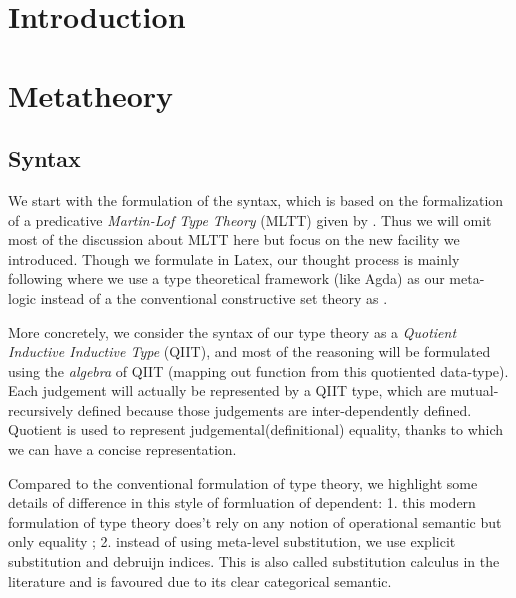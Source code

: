 \begin{abstract}

\end{abstract}

\maketitle

\section{Introduction}
\label{sec:intro}

\section{Metatheory}
\label{sec:metatheory}
\subsection{Syntax}
We start with the formulation of the syntax, which is based on the formalization of a predicative \textit{Martin-Lof Type Theory} (MLTT) given by \cite{coquand2018canonicity}. Thus we will omit most of the discussion about MLTT here but focus on the new facility we introduced. Though we formulate in Latex, our thought process is mainly following \cite{kaposi2017type} where we use a type theoretical framework (like Agda) as our meta-logic instead of a the conventional constructive set theory as \cite{coquand2018canonicity}. 

More concretely, we consider the syntax of our type theory as a \textit{Quotient Inductive Inductive Type} (QIIT), and most of the reasoning will be formulated using the \textit{algebra} of QIIT (mapping out function from this quotiented data-type). Each judgement will actually be represented by a QIIT type, which are mutual-recursively defined because those judgements are inter-dependently defined. Quotient is used to represent judgemental(definitional) equality, thanks to which we can have a concise representation.

Compared to the conventional formulation of type theory, we highlight some details of difference in this style of formluation of dependent: 1. this modern formulation of type theory does't rely on any notion of operational semantic but only equality 
;
2. instead of using meta-level substitution, we use explicit substitution and debruijn indices. This is also called substitution calculus in the literature and is favoured due to its clear categorical semantic.


